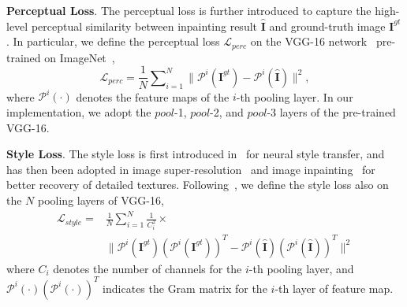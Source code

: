 \documentclass[10pt,journal,compsoc]{IEEEtran}
\begin{document}

{\textbf{Perceptual Loss}.} The perceptual loss is further introduced to capture the high-level perceptual similarity between inpainting result $\hat{\mathbf{I}}$ and ground-truth image $\mathbf{I}^{gt}$.
%
%
In particular, we define the perceptual loss $\mathcal{L}_{perc}$ on the VGG-16 network~\cite{SimonyanZ14a} pre-trained on ImageNet~\cite{ILSVRC15},
%
\begin{equation}\label{perc-loss}
\mathcal{L}_{perc} = \frac{1}{N}\sum\nolimits_{i=1}^{N} \parallel \mathcal{P}^{i}(\mathbf{I}^{gt}) - \mathcal{P}^{i}(\hat{\mathbf{I}})  \parallel^2,
\end{equation}
%
where $\mathcal{P}^{i}(\cdot)$ denotes the feature maps of the $i$-th pooling layer.
%
In our implementation, we adopt the $pool$-1, $pool$-2, and $pool$-3 layers of the pre-trained VGG-16.


%
{\textbf{Style Loss}.}  The style loss is first introduced in~\cite{Gatys2016ImageST} for neural style transfer, and has then been adopted in image super-resolution~\cite{Sajjadi_2017_ICCV} and image inpainting~\cite{partialconv2017} for better recovery of detailed textures.
%
Following~\cite{partialconv2017}, we define the style loss also on the $N$ pooling layers of VGG-16,
%
\begin{equation}\label{style-loss}
\begin{split}
\mathcal{L}_{style} = & \frac{1}{N} \sum\nolimits_{i=1}^{N} \frac{1}{C_{i}^2}  \times  \\
&\parallel \mathcal{P}^{i}(\mathbf{I}^{gt}) (\mathcal{P}^{i}(\mathbf{I}^{gt}))^{T} - \mathcal{P}^{i}(\hat{\mathbf{I}}) (\mathcal{P}^{i}(\hat{\mathbf{I}}))^{T} \parallel^2
\end{split}
\end{equation}
%
where $C_{i}$ denotes the number of channels for the $i$-th pooling layer, and $\mathcal{P}^{i}(\cdot) (\mathcal{P}^{i}(\cdot))^{T}$ indicates the Gram matrix for the $i$-th layer of feature map.


\end{document}
